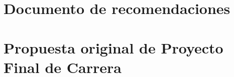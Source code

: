 %
\appendix
%
\chapter{Documento de recomendaciones}
\label{apx:recs}

%
\chapter{Propuesta original de Proyecto Final de Carrera}

%
